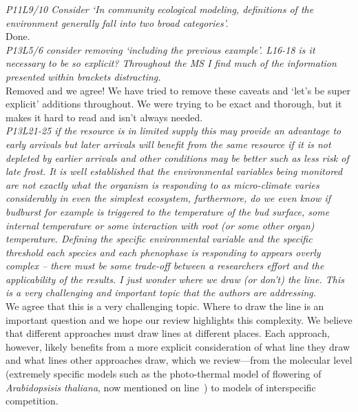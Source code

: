 \documentclass[11pt]{article}
\newcommand{\lr}[1]{line~\lineref{#1}}
\begin{document}
\emph{P11L9/10 Consider `In community ecological modeling, definitions of the environment generally
fall into two broad categories'.}\\

Done.\\

\emph{P13L5/6 consider removing `including the previous example'. L16-18 is it necessary to be so
explicit? Throughout the MS I find much of the information presented within brackets
distracting. }\\

Removed and we agree! We have tried to remove these caveats and `let's be super explicit' additions throughout. We were trying to be exact and thorough, but it makes it hard to read and isn't always needed.\\

\emph{P13L21-25 if the resource is in limited supply this may provide an advantage to
early arrivals but later arrivals will benefit from the same resource if it is not depleted
by earlier arrivals and other conditions may be better such as less risk of late frost.
It is well established that the environmental variables being monitored are not exactly what
the organism is responding to as micro-climate varies considerably in even the simplest
ecosystem, furthermore, do we even know if budburst for example is triggered to the
temperature of the bud surface, some internal temperature or some interaction with root (or
some other organ) temperature. Defining the specific environmental variable and the specific
threshold each species and each phenophase is responding to appears overly complex – there
must be some trade-off between a researchers effort and the applicability of the results. I
just wonder where we draw (or don't) the line. This is a very challenging and important topic
that the authors are addressing.}\\

We agree that this is a very challenging topic. Where to draw the line is an important question and we hope our review highlights this complexity. We believe that different approaches must draw lines at different places. Each approach, however, likely benefits from a more explicit consideration of what line they draw and what lines other approaches draw, which we review---from the molecular level (extremely specific models such as the photo-thermal model of flowering of  \emph{Arabidopsisis thaliana}, now mentioned on \lr{r2arab}) to models of interspecific competition. \\
\end{document}
